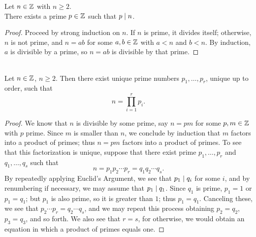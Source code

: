 \documentclass{amsart}
\begin{document}
\begin{Prop}
Let $n \in \mathbb{Z}$ with $n \ge 2$. \\
There exists a prime $p \in \mathbb{Z}$ such that $p \mid n$.
\end{Prop}

\begin{proof}
Proceed by strong induction on $n$. If $n$ is prime, it divides
itself; otherwise, $n$ is not prime, and $n = ab$ for some $a,b
\in \mathbb{Z}$ with $a < n$ and $b < n$. By induction, $a$ is divisible
by a prime, so $n = ab$ is divisible by that prime.
\end{proof}

\begin{Prop} \\
Let $n \in \mathbb{Z}$, $n \ge 2$.  Then there exist unique prime numbers
$p_1 , \dots , p_r$, unique up to order, such that
\[ n = \prod_{i=1}^r p_i . \]
\end{Prop}

\begin{proof}
We know that $n$ is divisible by some prime, say $n = pm$ for some
$p,m \in \mathbb{Z}$ with $p$ prime. Since $m$ is smaller than $n$, we
conclude by induction that $m$ factors into a product of primes;
thus $n = pm$ factors into a product of primes.
To see that this factorization is unique,
suppose that there exist prime $p_1, \dots, p_r$ and $q_1, \dots,
q_s$ such that
\[ n = p_1 p_2 \cdots p_r = q_1 q_2 \cdots q_s . \]
By repeatedly applying Euclid's Argument, we see that $p_1
\mid q_i$ for some $i$, and by renumbering if necessary, we
may assume that $p_1 \mid q_1$. Since $q_1$ is prime, $p_1 =
1$ or $p_1 = q_1$; but $p_1$ is also prime, so it is greater than
$1$; thus $p_1 = q_1$.  Canceling these, we see that $p_2 \cdots
p_r = q_2 \cdots q_s$, and we may repeat this process obtaining
$p_2 = q_2$, $p_3 = q_3$, and so forth. We also see that $r = s$,
for otherwise, we would obtain an equation in which a product of
primes equals one.
\end{proof}

\begin{comment}
\begin{Prop}
Let $P = \{ n \in \bZ \mid n \text{ is prime} \}$. Then $P$ is
infinite.
\end{Prop}

\begin{proof}
Suppose that $P$ is finite; then $P = \{ p_1, \dots, p_r \}$ for
some primes $p_i$. Set
\[ n = 1 + \prod_{i=1}^r p_i . \]
Clearly $n > 1$, so $n$ is divisible by some prime $p$, and $p =
p_i$ for some $i$. Thus $p$ divides $n$ and $\prod_{i=1}^r p_i$,
so $p$ divides $1 = n - \prod_{i=1}^r p_i$. But $1$ cannot be
divisible by a prime, so we have a contradiction.
\end{proof}
\end{comment}
\end{document}
